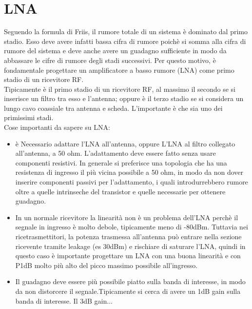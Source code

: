 \section{LNA}
Seguendo la formula di Friis, il rumore totale di un sistema è dominato dal primo stadio. Esso deve avere infatti bassa cifra di rumore poichè si somma alla cifra di rumore del sistema e deve anche avere un guadagno sufficiente in modo da abbassare le cifre di rumore degli stadi successivi. Per questo motivo, è fondamentale progettare un amplificatore a basso rumore (LNA) come primo stadio di un ricevitore RF.\\
Tipicamente è il primo stadio di un ricevitore RF, al massimo il secondo se si inserisce un filtro tra esso e l'antenna; oppure è il terzo stadio se si considera un lungo cavo coassiale tra antenna e scheda. L'importante è che sia uno dei primissimi stadi.\\
Cose importanti da sapere su LNA:
\begin{itemize}
\item è Necessario adattare l'LNA all'antenna, oppure L'LNA al filtro collegato all'antenna, a 50 ohm. L'adattamento deve essere fatto senza usare componenti resistivi. In generale si preferisce una topologia che ha una resistenza di ingresso il più vicina possibile a 50 ohm, in modo da non dover inserire componenti passivi per l'adattamento, i quali introdurrebbero rumore oltre a quelle intrinseche del transistor e quelle necessarie per ottenere guadagno.\\
\item In un normale ricevitore la linearità non è un problema dell'LNA perchè il segnale in ingresso è molto debole, tipicamente meno di -80dBm. Tuttavia nei ricetrasmettitori, la potenza trasmessa all'antenna può entrare nella sezione ricevente tramite leakage (es 30dBm) e rischiare di saturare l'LNA, quindi in questo caso è importante progettare un LNA con una buona linearità e con P1dB molto più alto del picco massimo possibile all'ingresso.\\
\item Il guadagno deve essere più possibile piatto sulla banda di interesse, in modo da non distorcere il segnale.Tipicamente si cerca di avere un 1dB gain sulla banda di interesse. Il 3dB gain...

\end{itemize}
